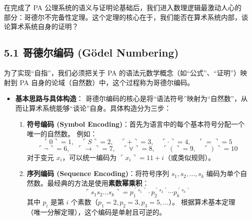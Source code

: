 \documentclass[12pt, a4paper]{article}
\begin{document}
在完成了 PA 公理系统的语义与证明论基础后，我们进入数理逻辑最激动人心的部分：哥德尔不完备性定理。这个定理的核心在于，我们能否在算术系统内部，谈论算术系统自身的证明？

\subsection*{5.1 哥德尔编码 (Gödel Numbering)}

为了实现“自指”，我们必须把关于 PA 的语法元数学概念（如“公式”、“证明”）映射到 PA 自身的论域（自然数）中，这个过程称为哥德尔编码。

\begin{itemize}
    \item \textbf{基本思路与具体构造}：
哥德尔编码的核心是将“语法符号”映射为“自然数”，从而让算术系统能够“谈论”自身。具体构造分为三步：
    \begin{enumerate}
        \item \textbf{符号编码 (Symbol Encoding)}：首先为语言中的每个基本符号分配一个唯一的自然数。
        例如：
        \[
        \ulcorner 0 \urcorner = 1, \quad \ulcorner S \urcorner = 2, \quad \ulcorner + \urcorner = 3, \quad \ulcorner \cdot \urcorner = 4, \quad \ulcorner = \urcorner = 5
        \]
        \[
        \ulcorner \neg \urcorner = 6, \quad \ulcorner \to \urcorner = 7, \quad \ulcorner \forall \urcorner = 8, \quad \ulcorner ( \urcorner = 9, \quad \ulcorner ) \urcorner = 10
        \]
        对于变元 \(x_i\)，可以统一编码为 \(\ulcorner x_i \urcorner = 11 + i\)（或类似规则）。
        
        \item \textbf{序列编码 (Sequence Encoding)}：将符号序列 \(s_1, s_2, \dots, s_k\) 编码为单个自然数。最经典的方法是使用\textbf{素数幂乘积}：
        \[
        \ulcorner s_1 s_2 \dots s_k \urcorner = p_1^{\ulcorner s_1 \urcorner} \cdot p_2^{\ulcorner s_2 \urcorner} \cdots p_k^{\ulcorner s_k \urcorner}
        \]
        其中 \(p_i\) 是第 \(i\) 个素数（\(p_1=2, p_2=3, p_3=5, \dots\)）。
        根据算术基本定理（唯一分解定理），这个编码是单射且可逆的。
        

\end{enumerate}
\end{itemize}
\end{document}
